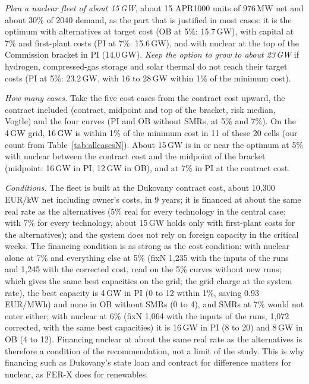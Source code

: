 \emph{Plan a nuclear fleet of about 15\,GW}, about 15 APR1000 units of 976\,MW net and about 30\% of 2040 demand, as the part that is justified in most cases: it is the optimum with alternatives at target cost (OB at 5\%: 15.7\,GW), with capital at 7\% and first-plant costs (PI at 7\%: 15.6\,GW), and with nuclear at the top of the Commission bracket in PI (14.0\,GW). \emph{Keep the option to grow to about 23\,GW} if hydrogen, compressed-gas storage and solar thermal do not reach their target costs (PI at 5\%: 23.2\,GW, with 16 to 28\,GW within 1\% of the minimum cost).

\emph{How many cases.} Take the five cost cases from the contract cost upward, the contract included (contract, midpoint and top of the bracket, risk median, Vogtle) and the four curves (PI and OB without SMRs, at 5\% and 7\%). On the 4\,GW grid, 16\,GW is within 1\% of the minimum cost in 11 of these 20 cells (our count from Table~\ref{tab:allcasesN}). About 15\,GW is in or near the optimum at 5\% with nuclear between the contract cost and the midpoint of the bracket (midpoint: 16\,GW in PI, 12\,GW in OB), and at 7\% in PI at the contract cost.

\emph{Conditions.} The fleet is built at the Dukovany contract cost, about 10{,}300\,EUR/kW net including owner's costs, in 9 years; it is financed at about the same real rate as the alternatives (5\% real for every technology in the central case; with 7\% for every technology, about 15\,GW holds only with first-plant costs for the alternatives); and the system does not rely on foreign capacity in the critical weeks. The financing condition is as strong as the cost condition: with nuclear alone at 7\% and everything else at 5\% (fixN 1{,}235 with the inputs of the runs and 1{,}245 with the corrected cost, read on the 5\% curves without new runs; which gives the same best capacities on the grid; the grid charge at the system rate), the best capacity is 4\,GW in PI (0 to 12 within 1\%, saving 0.93\,EUR/MWh) and none in OB without SMRs (0 to 4), and SMRs at 7\% would not enter either; with nuclear at 6\% (fixN 1{,}064 with the inputs of the runs, 1{,}072 corrected, with the same best capacities) it is 16\,GW in PI (8 to 20) and 8\,GW in OB (4 to 12). Financing nuclear at about the same real rate as the alternatives is therefore a condition of the recommendation, not a limit of the study. This is why financing such as Dukovany's state loan and contract for difference matters for nuclear, as FER-X does for renewables.

